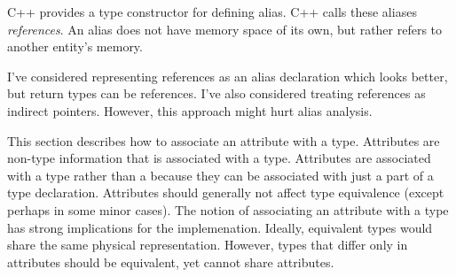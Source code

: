 C++ provides a type constructor for defining alias.  C++ calls these
aliases \emph{references}.  An alias does not have memory space of its
own, but rather refers to another entity's memory.  

I've considered representing references as an alias declaration which
looks better, but return types can be references.  I've also
considered treating references as indirect pointers.  However, this
approach might hurt alias analysis.


\label{sec:typeAttributes}
This section describes how to associate an attribute with a type.
Attributes are non-type information that is associated with a type.
Attributes are associated with a type rather than a 
because they can be associated with just a part of a type declaration.
Attributes should generally not affect type equivalence (except
perhaps in some minor cases).  The notion of associating an attribute
with a type has strong implications for the implemenation.  Ideally,
equivalent types would share the same physical representation.
However, types that differ only in attributes should be equivalent,
yet cannot share attributes.

